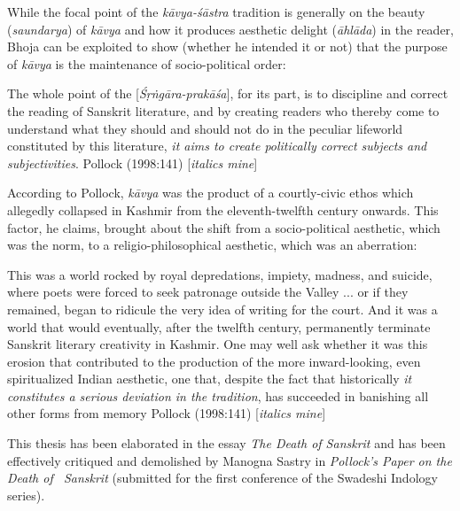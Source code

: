 While the focal point of the \textsl{kāvya-śāstra} tradition is generally on the beauty (\textsl{saundarya}) of \textsl{kāvya} and how it produces aesthetic delight (\textsl{āhlāda}) in the reader, Bhoja can be exploited to show (whether he intended it or not) that the purpose of \textsl{kāvya} is the maintenance of socio-political order:

\begin{myquote}
The whole point of the [\textsl{Śṛṅgāra-prakāśa}], for its part, is to discipline and correct the reading of Sanskrit literature, and by creating readers who thereby come to understand what they should and should not do in the peculiar lifeworld constituted by this literature, \textsl{it aims to create politically correct subjects and subjectivities}. 
\hfill Pollock (1998:141) [\textsl{italics mine}]
\end{myquote}

According to Pollock, \textsl{kāvya} was the product of a courtly-civic ethos which allegedly collapsed in Kashmir from the eleventh-twelfth century onwards. This factor, he claims, brought about the shift from a socio-political aesthetic, which was the norm, to a religio-philosophical aesthetic, which was an aberration:

\begin{myquote}
This was a world rocked by royal depredations, impiety, madness, and suicide, where poets were forced to seek patronage outside the Valley ... or if they remained, began to ridicule the very idea of writing for the court. And it was a world that would eventually, after the twelfth century, permanently terminate Sanskrit literary creativity in Kashmir. One may well ask whether it was this erosion that contributed to the production of the more inward-looking, even spiritualized Indian aesthetic, one that, despite the fact that historically \textsl{it constitutes a serious deviation in the tradition}, has succeeded in banishing all other forms from memory
\hfill Pollock (1998:141) [\textsl{italics mine}]
\end{myquote}

\smallskip

This thesis has been elaborated in the essay \textsl{The Death of Sanskrit} and has been effectively critiqued and demolished by Manogna Sastry in \textsl{Pollock's Paper on the Death of \ Sanskrit} (submitted for the first conference of the Swadeshi Indology series).

